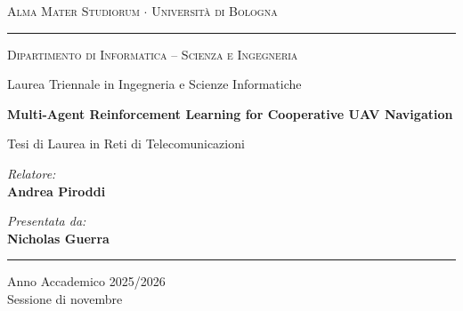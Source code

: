 \begin{titlepage}
    \thispagestyle{empty}
    \centering
    
    \vspace*{2cm}
    
    {\scshape\Large Alma Mater Studiorum $\cdot$ Università di Bologna \par}
    \vspace{0.3cm}
    \hrule
    \vspace{0.4cm}
    {\scshape\large Dipartimento di Informatica -- Scienza e Ingegneria \par}
    \vspace{0.2cm}
    {\large Laurea Triennale in Ingegneria e Scienze Informatiche \par}
    
    \vfill
    
    {\huge\bfseries Multi-Agent Reinforcement Learning for Cooperative UAV Navigation \par}
    \vspace{0.6cm}
    {\large Tesi di Laurea in \guillemotleft{}Reti di Telecomunicazioni\guillemotright{} \par}
    
    \vfill
    
    \begin{minipage}[t]{0.45\textwidth}
        \raggedright
        {\large \textit{Relatore:}\\[0.2cm]
        \textbf{Andrea Piroddi}}
    \end{minipage}%
    \hfill
    \begin{minipage}[t]{0.45\textwidth}
        \raggedleft
        {\large \textit{Presentata da:}\\[0.2cm]
        \textbf{Nicholas Guerra}}
    \end{minipage}
    
    \vfill
    
    \hrule
    \vspace{0.4cm}
    {\large Anno Accademico 2025/2026\\[0.15cm]
    Sessione di novembre \par}
\end{titlepage}
